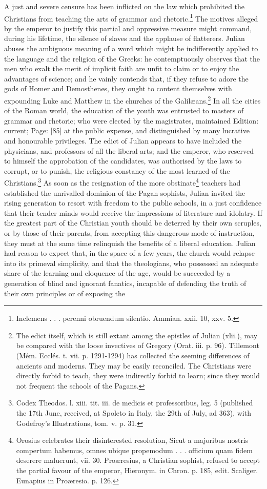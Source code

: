 A just and severe censure has been inflicted on the law which prohibited the Christians from teaching the arts of grammar and rhetoric.\footnote{Inclemens . . . perenni obruendum silentio. Ammian. xxii. 10, xxv. 5.} The motives alleged by the emperor to justify this partial and oppressive measure might command, during his lifetime, the silence of slaves and the applause of flatterers. Julian abuses the ambiguous meaning of a word which might be indifferently applied to the language and the religion of the Greeks: he contemptuously observes that the men who exalt the merit of implicit faith are unfit to claim or to enjoy the advantages of science; and he vainly contends that, if they refuse to adore the gods of Homer and Demosthenes, they ought to content themselves with expounding Luke and Matthew in the churches of the Galilæans.\footnote{The edict itself, which is still extant among the epistles of Julian (xlii.), may be compared with the loose invectives of Gregory (Orat. iii. p. 96). Tillemont (Mém. Ecclés. t. vii. p. 1291-1294) has collected the seeming differences of ancients and moderns. They may be easily reconciled. The Christians were directly forbid to teach, they were indirectly forbid to learn; since they would not frequent the schools of the Pagans.} In all the cities of the Roman world, the education of the youth was entrusted to masters of grammar and rhetoric; who were elected by the magistrates, maintained Edition: current; Page: [85] at the public expense, and distinguished by many lucrative and honourable privileges. The edict of Julian appears to have included the physicians, and professors of all the liberal arts; and the emperor, who reserved to himself the approbation of the candidates, was authorised by the laws to corrupt, or to punish, the religious constancy of the most learned of the Christians.\footnote{Codex Theodos. l. xiii. tit. iii. de medicis et professoribus, leg. 5 (published the 17th June, received, at Spoleto in Italy, the 29th of July, ad 363), with Godefroy\texthebrew{}’s Illustrations, tom. v. p. 31.} As soon as the resignation of the more obstinate\footnote{Orosius celebrates their disinterested resolution, Sicut a majoribus nostris compertum habemus, omnes ubique propemodum . . . officium quam fidem deserere maluerunt, vii. 30. Proæresius, a Christian sophist, refused to accept the partial favour of the emperor, Hieronym. in Chron. p. 185, edit. Scaliger. Eunapius in Proæresio. p. 126.} teachers had established the unrivalled dominion of the Pagan sophists, Julian invited the rising generation to resort with freedom to the public schools, in a just confidence that their tender minds would receive the impressions of literature and idolatry. If the greatest part of the Christian youth should be deterred by their own scruples, or by those of their parents, from accepting this dangerous mode of instruction, they must at the same time relinquish the benefits of a liberal education. Julian had reason to expect that, in the space of a few years, the church would relapse into its primeval simplicity, and that the theologians, who possessed an adequate share of the learning and eloquence of the age, would be succeeded by a generation of blind and ignorant fanatics, incapable of defending the truth of their own principles or of exposing the 